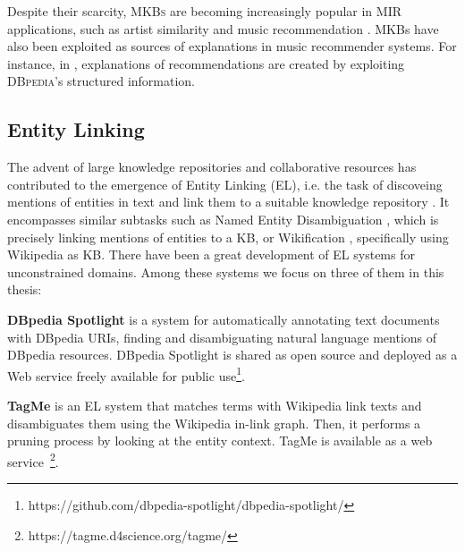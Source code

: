 Despite their scarcity, \textsc{MKBs} are becoming increasingly popular in MIR applications, such as artist similarity and music recommendation \citep{Celma2008,Leal2012,Ostuni2013}.
MKBs have also been exploited as sources of explanations in music recommender systems. %
For instance, in \citep{Passant2010}, explanations of recommendations are created by exploiting \textsc{DBpedia}'s structured information.%


\subsection{Entity Linking}
\label{sec:SOA:nlu:entity_linking}

The advent of large knowledge repositories and collaborative resources has contributed to the emergence of Entity Linking (EL), i.e. the task of discoveing mentions of entities in text and link them to a suitable knowledge repository \citep{Moroetal2014}. 
It encompasses similar subtasks such as Named Entity Disambiguation \citep{BunescuandPasca2006}, which is precisely linking mentions of entities to a KB, or Wikification \citep{MihalceaandCsomai2007}, specifically using Wikipedia as KB.
There have been a great development of EL systems for unconstrained domains. Among these systems we focus on three of them in this thesis:

\noindent \textbf{DBpedia Spotlight} \citep{Mendes2011} is a system for automatically annotating text documents with DBpedia URIs, finding and disambiguating natural language mentions of DBpedia resources. DBpedia Spotlight is shared as open source and deployed as a Web service freely available for public use\footnote{https://github.com/dbpedia-spotlight/dbpedia-spotlight/}.

\vspace{-0.2cm}
\noindent \textbf{TagMe} \citep{Ferragina2012} is an EL system that matches terms with Wikipedia link texts and disambiguates them using the Wikipedia in-link graph. Then, it performs a pruning process by looking at the entity context. TagMe is available as a web service~\footnote{https://tagme.d4science.org/tagme/}.

